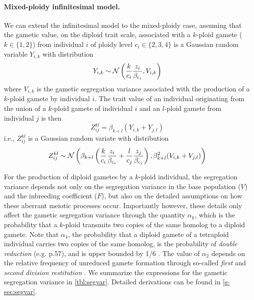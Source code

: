 \documentclass[11pt,a4paper]{article}
\begin{document}
\paragraph{Mixed-ploidy infinitesimal model.}

We can extend the infinitesimal model to the mixed-ploidy case, assuming that the
gametic value, on the diploid trait scale, associated with a $k$-ploid gamete ($k
\in \{1,2\}$) from individual $i$ of ploidy level $c_i \in \{2,3,4\}$ is a
Gaussian random variable $Y_{i,k}$ with distribution
  $$Y_{i,k} \sim \mathcal{N}\left(\frac{k}{c_i}\frac{z_i}{\beta_{c_i}}, V_{i,k}\right)$$
where $V_{i,k}$ is the gametic segregation variance associated with the
production of a $k$-ploid gamete by individual $i$.
The trait value of an individual originating from the union of a $k$-ploid
gamete of individual $i$ and an $l$-ploid gamete from individual $j$ is then
  $$Z_{ij}^{kl} = \beta_{k+l}\left(Y_{i,k} + Y_{j,l}\right)$$
i.e., $Z_{ij}^{kl}$ is a Gaussian random variate with distribution
\begin{equation}
  Z_{ij}^{kl} \sim \mathcal{N}\left(
    \beta_{k+l} \left(
          \frac{k}{c_i}\frac{z_i}{\beta_{c_i}} 
        + \frac{l}{c_j}\frac{z_j}{\beta_{c_j}}\right), 
    \beta_{k+l}^2 (V_{i,k} + V_{j,l})\right)
   \label{eq:oneline}
\end{equation}

For the production of diploid gametes by a $k$-ploid individual, the
segregation variance depends not only on the segregation variance in the base
population ($V$) and the inbreeding coefficient ($F$), but also on the detailed
assumptions on how these aberrant meiotic processes occur.
Importantly however, these details only affect the gametic segregation variance
through the quantity $\alpha_k$, which is the probability that a $k$-ploid
transmits two copies of the same homolog to a diploid gamete.
Note that $\alpha_4$, the probability that a diploid gamete of a tetraploid
individual carries two copies of the same homolog, is the probability of
\textit{double reduction} (e.g. \cite{lynch1998} p.57), and is upper bounded by
1/6 \citep{stift2008}.
The value of $\alpha_2$ depends on the relative frequency of unreduced gamete
formation through so-called \textit{first} and \textit{second division
restitution} \citep{bretagnolle1995,storme2013}.
We summarize the expressions for the gametic segregation variance in
\cref{tbl:segvar}.
Detailed derivations can be found in \cref{s-sec:segvar}.
\end{document}
